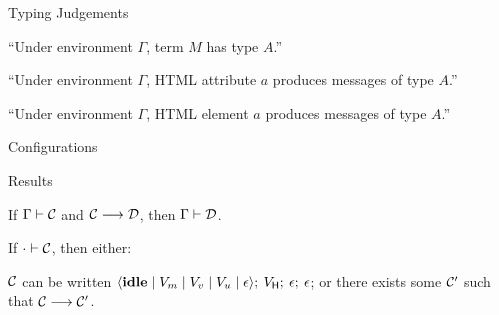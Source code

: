 \documentclass[11.5pt, aspectratio=169]{beamer}
\begin{document}
\begin{frame}{Typing Judgements}

  \begin{center}
  {\Huge {}}
  \vspace{0.5em}

    ``Under environment $\Gamma$, term $M$ has type $A$.''
  \end{center}
  \vspace{1em}

  \begin{center}
  {\Huge {}}
  \vspace{0.5em}

    ``Under environment $\Gamma$, HTML attribute $a$ produces messages of type $A$.''
  \end{center}
  \vspace{1em}

  \begin{center}
  {\Huge {}}
  \vspace{0.5em}

    ``Under environment $\Gamma$, HTML element $a$ produces messages of type $A$.''
  \end{center}
\end{frame}

\begin{frame}{Configurations}
\end{frame}

\begin{frame}{Results}

  {\large
\begin{theorem}
  \label{thm:config-pres}
  If $\Gamma \vdash \mathcal{C}$ and $\mathcal{C} \longrightarrow \mathcal{D}$, then $\Gamma \vdash \mathcal{D}$.
\end{theorem}
%
\vspace{2em}
%
  \begin{theorem}\label{thm:event-progress}
    If $\cdot \vdash \mathcal{C}$, then either:
    \begin{itemize}
      \itemR $\mathcal{C}$ can be written $\langle \mathbf{\mathbf{idle}} \mid V_m \mid V_v \mid V_u \mid \epsilon \rangle ;\: V_{\textsf{H}} ;\: \epsilon ;\: \epsilon$; or
      \itemR there exists some $\mathcal{C}'$ such that $\mathcal{C} \longrightarrow \mathcal{C'}$.
      \end{itemize}
  \end{theorem}
}
\end{frame}
\end{document}
